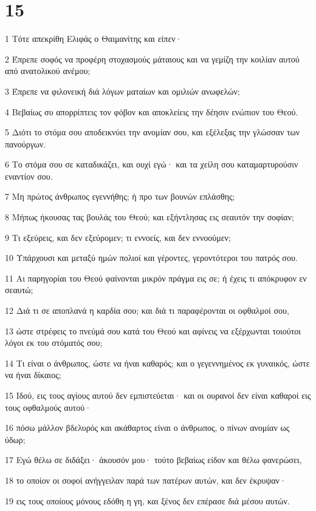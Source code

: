 \chapter{15}

\par 1 Τότε απεκρίθη Ελιφάς ο Θαιμανίτης και είπεν·
\par 2 Έπρεπε σοφός να προφέρη στοχασμούς μάταιους και να γεμίζη την κοιλίαν αυτού από ανατολικού ανέμου;
\par 3 Έπρεπε να φιλονεική διά λόγων ματαίων και ομιλιών ανωφελών;
\par 4 Βεβαίως συ απορρίπτεις τον φόβον και αποκλείεις την δέησιν ενώπιον του Θεού.
\par 5 Διότι το στόμα σου αποδεικνύει την ανομίαν σου, και εξέλεξας την γλώσσαν των πανούργων.
\par 6 Το στόμα σου σε καταδικάζει, και ουχί εγώ· και τα χείλη σου καταμαρτυρούσιν εναντίον σου.
\par 7 Μη πρώτος άνθρωπος εγεννήθης; ή προ των βουνών επλάσθης;
\par 8 Μήπως ήκουσας τας βουλάς του Θεού; και εξήντλησας εις σεαυτόν την σοφίαν;
\par 9 Τι εξεύρεις, και δεν εξεύρομεν; τι εννοείς, και δεν εννοούμεν;
\par 10 Υπάρχουσι και μεταξύ ημών πολιοί και γέροντες, γεροντότεροι του πατρός σου.
\par 11 Αι παρηγορίαι του Θεού φαίνονται μικρόν πράγμα εις σε; ή έχεις τι απόκρυφον εν σεαυτώ;
\par 12 Διά τι σε αποπλανά η καρδία σου; και διά τι παραφέρονται οι οφθαλμοί σου,
\par 13 ώστε στρέφεις το πνεύμά σου κατά του Θεού και αφίνεις να εξέρχωνται τοιούτοι λόγοι εκ του στόματός σου;
\par 14 Τι είναι ο άνθρωπος, ώστε να ήναι καθαρός; και ο γεγεννημένος εκ γυναικός, ώστε να ήναι δίκαιος;
\par 15 Ιδού, εις τους αγίους αυτού δεν εμπιστεύεται· και οι ουρανοί δεν είναι καθαροί εις τους οφθαλμούς αυτού·
\par 16 πόσω μάλλον βδελυρός και ακάθαρτος είναι ο άνθρωπος, ο πίνων ανομίαν ως ύδωρ;
\par 17 Εγώ θέλω σε διδάξει· άκουσόν μου· τούτο βεβαίως είδον και θέλω φανερώσει,
\par 18 το οποίον οι σοφοί ανήγγειλαν παρά των πατέρων αυτών, και δεν έκρυψαν·
\par 19 εις τους οποίους μόνους εδόθη η γη, και ξένος δεν επέρασε διά μέσου αυτών.
